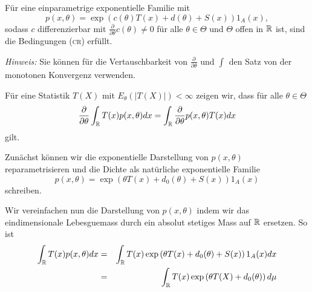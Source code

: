 Für eine einparametrige exponentielle Familie mit
\begin{equation*}
	p(x, \theta) = \exp \left( c(\theta) T(x) + d(\theta) +S(x) \right)1_A(x),
\end{equation*}
sodass $c$ differenzierbar mit $\frac{\partial}{\partial \theta} c(\theta)\neq 0$ 
für alle $\theta\in \Theta$ und $\Theta$ offen in $\mathbb R$ ist, sind die Bedingungen (\textsc{cr})
erfüllt.

\emph{Hinweis:} Sie können für die Vertauschbarkeit von $\frac{\partial}{\partial \theta}$ und $\int_{}^{}$
den Satz von der monotonen Konvergenz verwenden. 

\solution
Für eine Statistik $T(X)$ mit $E_\theta (|T(X)|) < \infty$ zeigen wir, dass für alle $\theta\in\Theta$
\begin{equation}
	\frac{\partial}{\partial \theta} \int_{\mathbb R}^{} T(x) p(x,\theta) dx = 
	\int_{\mathbb R}^{} \frac{\partial}{\partial \theta} p(x,\theta) T(x) dx
	\label{main-interchange}
\end{equation}
gilt.

Zunächst können wir die exponentielle Darstellung von $p(x,\theta)$
reparametrisieren und die Dichte als natürliche exponentielle Familie 
\begin{equation}
	p(x,\theta) = \exp \left( \theta T(x) + d_0(\theta) + S(x) \right)1_A(x)
\end{equation}
schreiben.

Wir vereinfachen nun die Darstellung von $p(x,\theta)$ indem wir das eindimensionale
Lebesguemass durch ein absolut stetiges Mass auf $\mathbb R$ ersetzen. So ist 
\begin{eqnarray}
	\int_{\mathbb R}^{} T(x) p(x,\theta) dx &=& 
	\int_{\mathbb R}^{} T(x) \exp \left( \theta T(x) + d_0(\theta) + S(x) \right)1_A(x) dx \\
	&=& \int_{\mathbb R}^{} T(x) \exp \left( \theta T(X) + d_0(\theta) \right) d\mu 
\end{eqnarray}

